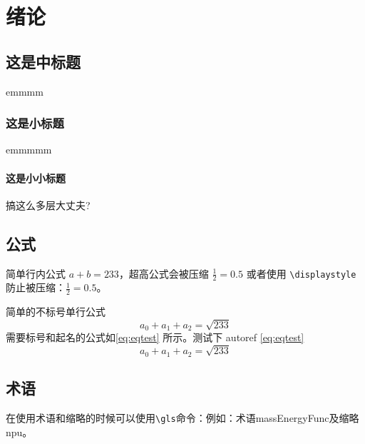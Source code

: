 \documentclass[lang=chs, degree=phd, blindreview=false, winfonts=true, academic=true]{yanputhesis}
\begin{document}
\tableofcontents                                            %
\printglossary[type=\acronymtype,title=缩写表]				  %
\printglossary[title=术语表]								  %
\listoffigures                                              %
\listoftables                                               %
\printnomenclature                                          %
\mainmatter
\sDefault
\chapter{绪论}
\section{这是中标题}
emmmm
\subsection{这是小标题}
emmmmm
\subsubsection{这是小小标题}
搞这么多层大丈夫?

\section{公式}
简单行内公式 $a+b=233$，超高公式会被压缩 $\frac{1}{2}=0.5$ 或者使用
\lstinline`\displaystyle` 防止被压缩：$\displaystyle \frac{1}{2}=0.5$。

简单的不标号单行公式
$$a_0+a_1+a_2=\sqrt{233}$$
需要标号和起名的公式如\autoref{eq:eqtest} 所示。测试下 autoref \autoref{eq:eqtest}
\begin{equation}
    \label{eq:eqtest}
    a_0 + a_1 + a_2 = \sqrt{233}
\end{equation}

\section{术语}

在使用术语和缩略的时候可以使用\lstinline`\gls`命令：例如：术语\gls{massEnergyFunc}及缩略\gls{npu}。
\end{document}
